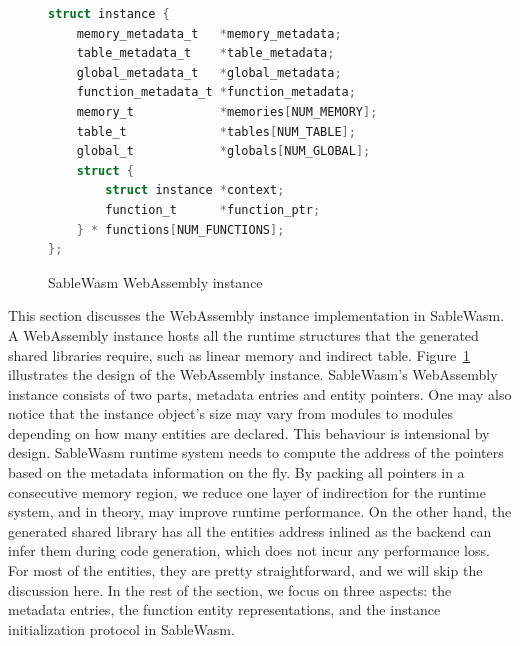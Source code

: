 \begin{figure}
\begin{minipage}{.35\textwidth}
    \end{minipage}\hfill
    \begin{minipage}{.6\textwidth}
        \begin{lstlisting}[language=C, basicstyle=\ttfamily\footnotesize]
struct instance {
    memory_metadata_t   *memory_metadata;
    table_metadata_t    *table_metadata;
    global_metadata_t   *global_metadata;
    function_metadata_t *function_metadata;
    memory_t            *memories[NUM_MEMORY];
    table_t             *tables[NUM_TABLE];
    global_t            *globals[NUM_GLOBAL];
    struct {
        struct instance *context;
        function_t      *function_ptr;
    } * functions[NUM_FUNCTIONS];
};        
    \end{lstlisting}
    \end{minipage}
    \caption{SableWasm WebAssembly instance}
    \label{fig:backend-instance}
\end{figure}

This section discusses the WebAssembly instance implementation in SableWasm. A WebAssembly instance hosts all the runtime structures that the generated shared libraries require, such as linear memory and indirect table. Figure~\ref{fig:backend-instance} illustrates the design of the WebAssembly instance. SableWasm's WebAssembly instance consists of two parts, metadata entries and entity pointers. One may also notice that the instance object's size may vary from modules to modules depending on how many entities are declared. This behaviour is intensional by design. SableWasm runtime system needs to compute the address of the pointers based on the metadata information on the fly. By packing all pointers in a consecutive memory region, we reduce one layer of indirection for the runtime system, and in theory, may improve runtime performance. On the other hand, the generated shared library has all the entities address inlined as the backend can infer them during code generation, which does not incur any performance loss. For most of the entities, they are pretty straightforward, and we will skip the discussion here. In the rest of the section, we focus on three aspects: the metadata entries, the function entity representations, and the instance initialization protocol in SableWasm.

